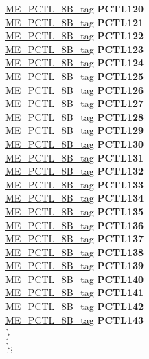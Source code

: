 \begin{DoxyCompactItemize}
\begin{tabbing}
\>\>\mbox{\hyperlink{unionME__PCTL__8B__tag}{ME\_PCTL\_8B\_tag}} {\bfseries PCTL120}\\
\>\>\mbox{\hyperlink{unionME__PCTL__8B__tag}{ME\_PCTL\_8B\_tag}} {\bfseries PCTL121}\\
\>\>\mbox{\hyperlink{unionME__PCTL__8B__tag}{ME\_PCTL\_8B\_tag}} {\bfseries PCTL122}\\
\>\>\mbox{\hyperlink{unionME__PCTL__8B__tag}{ME\_PCTL\_8B\_tag}} {\bfseries PCTL123}\\
\>\>\mbox{\hyperlink{unionME__PCTL__8B__tag}{ME\_PCTL\_8B\_tag}} {\bfseries PCTL124}\\
\>\>\mbox{\hyperlink{unionME__PCTL__8B__tag}{ME\_PCTL\_8B\_tag}} {\bfseries PCTL125}\\
\>\>\mbox{\hyperlink{unionME__PCTL__8B__tag}{ME\_PCTL\_8B\_tag}} {\bfseries PCTL126}\\
\>\>\mbox{\hyperlink{unionME__PCTL__8B__tag}{ME\_PCTL\_8B\_tag}} {\bfseries PCTL127}\\
\>\>\mbox{\hyperlink{unionME__PCTL__8B__tag}{ME\_PCTL\_8B\_tag}} {\bfseries PCTL128}\\
\>\>\mbox{\hyperlink{unionME__PCTL__8B__tag}{ME\_PCTL\_8B\_tag}} {\bfseries PCTL129}\\
\>\>\mbox{\hyperlink{unionME__PCTL__8B__tag}{ME\_PCTL\_8B\_tag}} {\bfseries PCTL130}\\
\>\>\mbox{\hyperlink{unionME__PCTL__8B__tag}{ME\_PCTL\_8B\_tag}} {\bfseries PCTL131}\\
\>\>\mbox{\hyperlink{unionME__PCTL__8B__tag}{ME\_PCTL\_8B\_tag}} {\bfseries PCTL132}\\
\>\>\mbox{\hyperlink{unionME__PCTL__8B__tag}{ME\_PCTL\_8B\_tag}} {\bfseries PCTL133}\\
\>\>\mbox{\hyperlink{unionME__PCTL__8B__tag}{ME\_PCTL\_8B\_tag}} {\bfseries PCTL134}\\
\>\>\mbox{\hyperlink{unionME__PCTL__8B__tag}{ME\_PCTL\_8B\_tag}} {\bfseries PCTL135}\\
\>\>\mbox{\hyperlink{unionME__PCTL__8B__tag}{ME\_PCTL\_8B\_tag}} {\bfseries PCTL136}\\
\>\>\mbox{\hyperlink{unionME__PCTL__8B__tag}{ME\_PCTL\_8B\_tag}} {\bfseries PCTL137}\\
\>\>\mbox{\hyperlink{unionME__PCTL__8B__tag}{ME\_PCTL\_8B\_tag}} {\bfseries PCTL138}\\
\>\>\mbox{\hyperlink{unionME__PCTL__8B__tag}{ME\_PCTL\_8B\_tag}} {\bfseries PCTL139}\\
\>\>\mbox{\hyperlink{unionME__PCTL__8B__tag}{ME\_PCTL\_8B\_tag}} {\bfseries PCTL140}\\
\>\>\mbox{\hyperlink{unionME__PCTL__8B__tag}{ME\_PCTL\_8B\_tag}} {\bfseries PCTL141}\\
\>\>\mbox{\hyperlink{unionME__PCTL__8B__tag}{ME\_PCTL\_8B\_tag}} {\bfseries PCTL142}\\
\>\>\mbox{\hyperlink{unionME__PCTL__8B__tag}{ME\_PCTL\_8B\_tag}} {\bfseries PCTL143}\\
\>\} \\
\}; \\

\end{tabbing}\end{DoxyCompactItemize}


